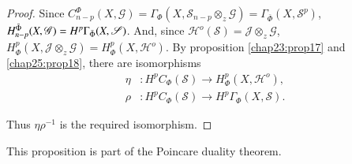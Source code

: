 \begin{proof}
Since $C^\Phi_{n-p}(X, \mathscr{G})=\Gamma _\Phi
(X,\mathscr{S}_{n-p} \otimes _z \mathscr{G})=\Gamma _{\bar{\Phi}}
(X,\mathscr{S}^p)$, $H^{\bar{\Phi}}_{n-p}(X,\break\mathscr{G})=H^p \Gamma
_{\bar{\Phi}}(X,\mathscr{S})$. And, since
$\mathscr{H}^o(\mathscr{S})=\mathcal{J}\otimes _z \mathscr{G}$,
$H^p_{\Phi}(X, \mathcal{J}\otimes _z \mathscr{G})=H^p_\Phi
(X,\mathscr{H}^o)$. By proposition \ref{chap23:prop17} and
\ref{chap25:prop18}, there are isomorphisms 
\begin{align*}
\eta &: H^p C_{\Phi} (\mathscr{S}) \to H^p_ \Phi (X, \mathscr{H}^o), \\
\rho &: H^p C_{\Phi} (\mathscr{S}) \to H^p \Gamma_ \Phi (X,\mathscr{S}).
\end{align*}

Thus $\eta \rho^{-1}$ is the required isomorphism.
\end{proof}

This proposition is part of the Poincare duality theorem. 


